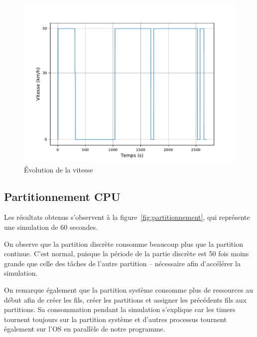 \documentclass[conference]{IEEEtran}
\begin{document}
\begin{figure}[h]
    \centering
    \includegraphics[width=\linewidth]{speed.pdf}  
    \caption{Évolution de la vitesse}
    \label{fig:speed}
\end{figure}

\subsection{Partitionnement CPU}

Les résultats obtenus s'observent à la figure~\ref{fig:partitionnement}, qui représente une simulation de 60 secondes.

On observe que la partition discrète consomme beaucoup plus que la partition continue. C'est normal, puisque la période de la partie discrète est 50 fois moins grande que celle des tâches de l'autre partition -- nécessaire afin d'accélérer la simulation.

On remarque également que la partition système consomme plus de ressources au début afin de créer les fils, créer les partitions et assigner les précédents fils aux partitions. Sa consommation pendant la simulation s'explique car les timers tournent toujours sur la partition système et d'autres processus tournent également sur l'OS en parallèle de notre programme.
\end{document}
